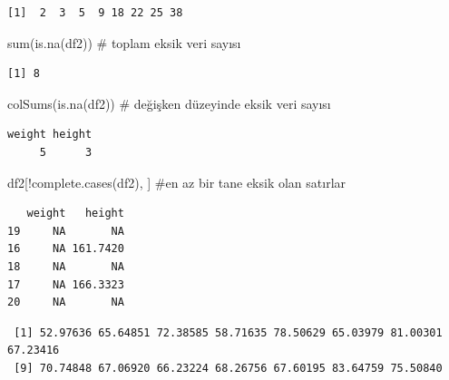 \documentclass[
  letterpaper,
  DIV=11,
  numbers=noendperiod]{scrreprt}
\newenvironment{Shaded}{\begin{snugshade}}{\end{snugshade}}
\newcommand{\CommentTok}[1]{\textcolor[rgb]{0.37,0.37,0.37}{#1}}
\newcommand{\FunctionTok}[1]{\textcolor[rgb]{0.28,0.35,0.67}{#1}}
\newcommand{\NormalTok}[1]{\textcolor[rgb]{0.00,0.23,0.31}{#1}}
\newcommand{\SpecialCharTok}[1]{\textcolor[rgb]{0.37,0.37,0.37}{#1}}
\begin{document}
\begin{verbatim}
[1]  2  3  5  9 18 22 25 38
\end{verbatim}

\begin{Shaded}
\begin{Highlighting}[]
\FunctionTok{sum}\NormalTok{(}\FunctionTok{is.na}\NormalTok{(df2)) }\CommentTok{\# toplam eksik veri sayısı}
\end{Highlighting}
\end{Shaded}

\begin{verbatim}
[1] 8
\end{verbatim}

\begin{Shaded}
\begin{Highlighting}[]
\FunctionTok{colSums}\NormalTok{(}\FunctionTok{is.na}\NormalTok{(df2)) }\CommentTok{\# değişken düzeyinde eksik veri sayısı}
\end{Highlighting}
\end{Shaded}

\begin{verbatim}
weight height 
     5      3 
\end{verbatim}

\begin{Shaded}
\begin{Highlighting}[]
\NormalTok{df2[}\SpecialCharTok{!}\FunctionTok{complete.cases}\NormalTok{(df2), ] }\CommentTok{\#en az bir tane eksik olan satırlar}
\end{Highlighting}
\end{Shaded}

\begin{verbatim}
   weight   height
19     NA       NA
16     NA 161.7420
18     NA       NA
17     NA 166.3323
20     NA       NA
\end{verbatim}

\begin{Shaded}
\end{Shaded}

\begin{verbatim}
 [1] 52.97636 65.64851 72.38585 58.71635 78.50629 65.03979 81.00301 67.23416
 [9] 70.74848 67.06920 66.23224 68.26756 67.60195 83.64759 75.50840
\end{verbatim}
\end{document}

